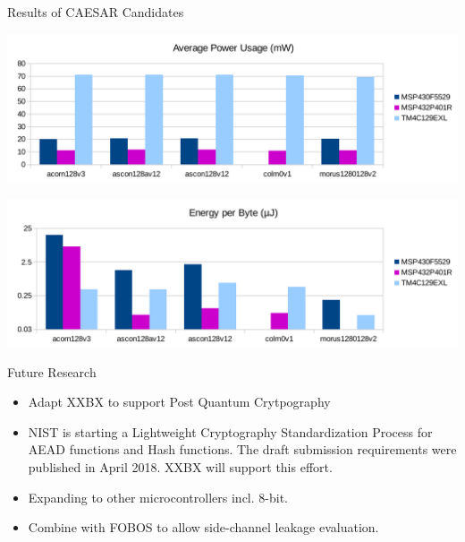\documentclass[xcolor=pdftex,dvipsnames,table,final]{beamer}
\begin{document}
\begin{frame}[fragile]{}
\begin{columns}[t, totalwidth=\textwidth]
\begin{column}{.675\linewidth}
\begin{columns}
\begin{column}{.473\linewidth}
\begin{block}{Results of CAESAR Candidates}
\begin{center}

           \includegraphics[width=1.0\linewidth]{../figures/averagepower}

           \includegraphics[width=1.0\linewidth]{../figures/energy}

         \end{center}
       \end{block}

       \begin{block}{Future Research}
        \begin{itemize}
          \item Adapt XXBX to support Post Quantum Crytpography
          \item NIST is starting a Lightweight Cryptography Standardization Process for
                AEAD functions and Hash functions. The draft submission requirements 
                were published in April 2018. XXBX will support this effort.
          \item Expanding to other microcontrollers incl. 8-bit.
          \item Combine with FOBOS to allow side-channel leakage evaluation.
        \end{itemize}
       \end{block}

%          
%          
   \end{column}
   \end{columns}


\end{column}
\end{columns}
\end{frame}
\end{document}
